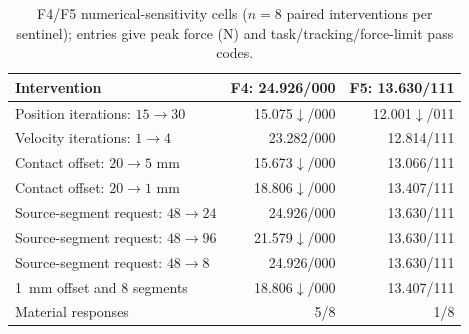 \begin{table}[t]
\centering
\caption{F4/F5 numerical-sensitivity cells ($n=8$ paired interventions per
sentinel); entries give peak force (N) and task/tracking/force-limit pass codes.}
\label{tab:numerical_cells_f4_f5}
\vspace{-3mm}
\scriptsize
\setlength{\tabcolsep}{3.2pt}
\renewcommand{\arraystretch}{0.90}
\begin{tabular}{@{}lrr@{}}
\toprule
Intervention & F4: 24.926/000 & F5: 13.630/111 \\
\midrule
Position iterations: $15\rightarrow30$ & 15.075$\downarrow$/000 & 12.001$\downarrow$/011 \\
Velocity iterations: $1\rightarrow4$ & 23.282/000 & 12.814/111 \\
Contact offset: $20\rightarrow5$ mm & 15.673$\downarrow$/000 & 13.066/111 \\
Contact offset: $20\rightarrow1$ mm & 18.806$\downarrow$/000 & 13.407/111 \\
Source-segment request: $48\rightarrow24$ & 24.926/000 & 13.630/111 \\
Source-segment request: $48\rightarrow96$ & 21.579$\downarrow$/000 & 13.630/111 \\
Source-segment request: $48\rightarrow8$ & 24.926/000 & 13.630/111 \\
1~mm offset and 8 segments & 18.806$\downarrow$/000 & 13.407/111 \\
\midrule
Material responses & 5/8 & 1/8 \\
\bottomrule
\end{tabular}
\end{table}
